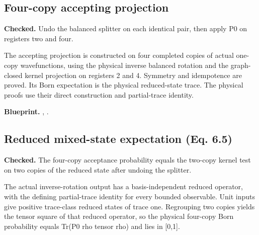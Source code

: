 \subsection{Four-copy accepting projection}\label{paper:four-copy}
\textbf{Checked.} Undo the balanced splitter on each identical pair, then apply P0 on registers two and four. 

The accepting projection is constructed on four completed copies of actual one-copy wavefunctions, using the physical inverse balanced rotation and the graph-closed kernel projection on registers 2 and 4. Symmetry and idempotence are proved. Its Born expectation is the physical reduced-state trace. The physical proofs use their direct construction and partial-trace identity.


\textbf{Blueprint.} , .

\subsection{Reduced mixed-state expectation (Eq. 6.5)}\label{paper:boson-reduced-state}
\textbf{Checked.} The four-copy acceptance probability equals the two-copy kernel test on two copies of the reduced state after undoing the splitter. 

The actual inverse-rotation output has a basis-independent reduced operator, with the defining partial-trace identity for every bounded observable. Unit inputs give positive trace-class reduced states of trace one. Regrouping two copies yields the tensor square of that reduced operator, so the physical four-copy Born probability equals Tr(P0 rho tensor rho) and lies in [0,1].

